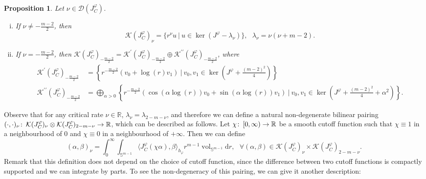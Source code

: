\documentclass{article}
\numberwithin{equation}{section}        %
\theoremstyle{bfnote}
\newtheorem{prop}[thm]{Proposition}         %
\theoremstyle{definition}
\theoremstyle{bfremark}
\newcommand{\col}{\colon \thinspace}        %
\newcommand{\R}{\mathbb{R}}                 %
\newcommand{\Sp}{\mathbb{S}}                %
\newcommand{\diff}{\mathrm{d}}                      %
\DeclareMathOperator{\vol}{vol}                 %
\begin{document}
\begin{prop}
    Let $\nu \in \mathcal{D}(J^\varphi_C)$.
    \begin{enumerate}[(i)]
        \item If $\nu \neq -\tfrac{m-2}{2}$, then
        \begin{equation*}
            \mathcal{K}(J^\varphi_C)_\nu = \{ r^\nu u ~ | ~ u \in \ker(J^\varphi-\lambda_\nu) \} , ~~~ \lambda_\nu = \nu(\nu+m-2) .
        \end{equation*}
        \item If $\nu = - \tfrac{m-2}{2}$, then $\mathcal{K}(J^\varphi_C)_{-\tfrac{m-2}{2}} = \mathcal{K}^\prime(J^\varphi_C)_{-\tfrac{m-2}{2}} \oplus \mathcal{K}^{\prime\prime}(J^\varphi_C)_{-\tfrac{m-2}{2}}$, where
        \begin{align*}
            \mathcal{K}^\prime(J^\varphi_C)_{-\tfrac{m-2}{2}} & = \left\{ r^{-\tfrac{m-2}{2}} (v_0 + \log(r) v_1) ~ | ~ v_0,v_1 \in \ker(J^\varphi + \tfrac{(m-2)^2}{4}) \right\} \\
            \mathcal{K}^{\prime\prime}(J^\varphi_C)_{-\tfrac{m-2}{2}} & = \bigoplus_{\alpha > 0} \left\{ r^{-\tfrac{m-2}{2}}(\cos(\alpha \log(r)) v_0 + \sin(\alpha \log(r) ) v_1) ~ | ~ v_0, v_1 \in \ker(J^\varphi + \tfrac{(m-2)^2}{4} + \alpha^2) \right\} .
        \end{align*}
    \end{enumerate}
\end{prop}

Observe that for any critical rate $\nu \in \R$, $\lambda_\nu = \lambda_{2-m-\nu}$, and therefore we can define a natural non-degenerate bilinear pairing $(\cdot,\cdot)_\nu \col \mathcal{K}(J^\varphi_C)_\nu \otimes \mathcal{K}(J^\varphi_C)_{2-m-\nu} \rightarrow \R$, which can be described as follows. Let $\chi \col [0,\infty) \rightarrow \R$ be a smooth cutoff function such that $\chi \equiv 1$ in a neighbourhood of $0$ and $\chi \equiv 0$ in a neighbourhood of $+\infty$. Then we can define
\begin{equation*}
    (\alpha,\beta)_\nu = \int_0^\infty \int_{\Sp^{m-1}} \langle J^\varphi_C(\chi \alpha), \beta \rangle_{h_\varphi} r^{m-1} \vol_{\Sp^{m-1}} \diff  r, ~~~ \forall (\alpha,\beta) \in \mathcal{K}(J^\varphi_C)_\nu \times \mathcal{K}(J^\varphi_C)_{2-m-\nu} .
\end{equation*}
Remark that this definition does not depend on the choice of cutoff function, since the difference between two cutoff functions is compactly supported and we can integrate by parts. To see the non-degeneracy of this pairing, we can give it another description:
\end{document}
